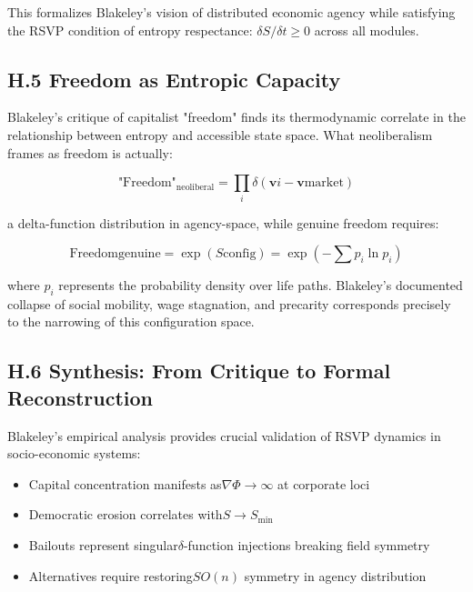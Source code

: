 \documentclass[11pt,a4paper,titlepage]{article}
\theoremstyle{definition}
\begin{document}
\begin{itemize}
This formalizes Blakeley's vision of distributed economic agency while satisfying the RSVP condition of entropy respectance: $\delta S/\delta t \geq 0$ across all modules.

\subsection*{H.5 Freedom as Entropic Capacity}

Blakeley's critique of capitalist "freedom" finds its thermodynamic correlate in the relationship between entropy and accessible state space. What neoliberalism frames as freedom is actually:

\begin{equation}
\text{"Freedom"}_{\text{neoliberal}}= \prod_i \delta(\mathbf{v}i - \mathbf{v}{\text{market}})
\label{eq:pseudo_freedom}
\end{equation}

a delta-function distribution in agency-space, while genuine freedom requires:

\begin{equation}
\text{Freedom}{\text{genuine}} = \exp(S{\text{config}})= \exp\left(-\sum p_i \ln p_i\right)
\label{eq:true_freedom}
\end{equation}

where $p_i$ represents the probability density over life paths. Blakeley's documented collapse of social mobility, wage stagnation, and precarity corresponds precisely to the narrowing of this configuration space.

\subsection*{H.6 Synthesis: From Critique to Formal Reconstruction}

Blakeley's empirical analysis provides crucial validation of RSVP dynamics in socio-economic systems:
\begin{itemize}
\item Capital concentration manifests as$\nabla\Phi \rightarrow \infty$ at corporate loci
\item Democratic erosion correlates with$S \rightarrow S_{\min}$
\item Bailouts represent singular$\delta$-function injections breaking field symmetry
\item Alternatives require restoring$SO(n)$ symmetry in agency distribution
\end{itemize}


\end{itemize}
\end{document}
